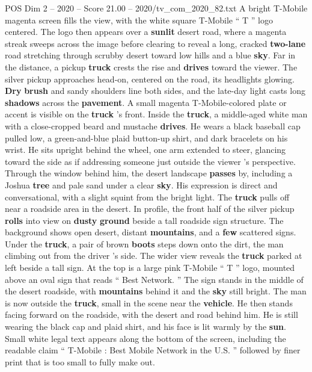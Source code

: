 \begin{textsample}{POS Dim 2 – 2020 – Score 21.00 – 2020/tv\_com\_2020\_82.txt}  \label{ex:f2_pos_046}
A bright T-Mobile magenta screen fills the view, with the white square T-Mobile “ T ” logo centered.
The logo then appears over a \textbf{sunlit} desert road, where a magenta streak sweeps across the image before clearing to reveal a long, cracked \textbf{two-lane} road stretching through scrubby desert toward low hills and a blue \textbf{sky}.
Far in the distance, a pickup \textbf{truck} crests the rise and \textbf{drives} toward the viewer.
The silver pickup approaches head-on, centered on the road, its headlights glowing. \textbf{Dry} \textbf{brush} and sandy shoulders line both sides, and the late-day light casts long \textbf{shadows} across the \textbf{pavement}.
A small magenta T-Mobile-colored plate or accent is visible on the \textbf{truck} ’s front.
Inside the \textbf{truck}, a middle-aged white man with a close-cropped beard and mustache \textbf{drives}.
He wears a black baseball cap pulled low, a green-and-blue plaid button-up shirt, and dark bracelets on his wrist.
He sits upright behind the wheel, one arm extended to steer, glancing toward the side as if addressing someone just outside the viewer ’s perspective.
Through the window behind him, the desert landscape \textbf{passes} by, including a Joshua \textbf{tree} and pale sand under a clear \textbf{sky}.
His expression is direct and conversational, with a slight squint from the bright light.
The \textbf{truck} pulls off near a roadside area in the desert.
In profile, the front half of the silver pickup \textbf{rolls} into view on \textbf{dusty} \textbf{ground} beside a tall roadside sign structure.
The background shows open desert, distant \textbf{mountains}, and a \textbf{few} scattered signs.
Under the \textbf{truck}, a pair of brown \textbf{boots} steps down onto the dirt, the man climbing out from the driver ’s side.
The wider view reveals the \textbf{truck} parked at left beside a tall sign.
At the top is a large pink T-Mobile “ T ” logo, mounted above an oval sign that reads “ Best Network. ” The sign stands in the middle of the desert roadside, with \textbf{mountains} behind it and the \textbf{sky} still bright.
The man is now outside the \textbf{truck}, small in the scene near the \textbf{vehicle}.
He then stands facing forward on the roadside, with the desert and road behind him.
He is still wearing the black cap and plaid shirt, and his face is lit warmly by the \textbf{sun}.
Small white legal text appears along the bottom of the screen, including the readable claim “ T-Mobile : Best Mobile Network in the U.S. ” followed by finer print that is too small to fully make out.

\end{textsample}
